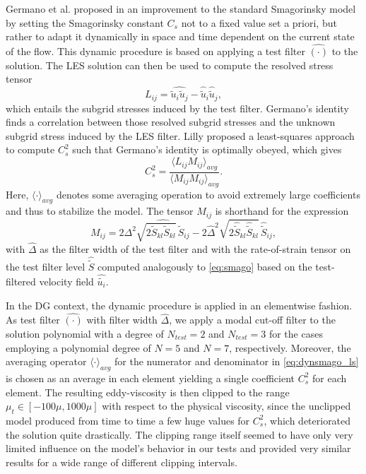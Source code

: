 Germano et al. proposed in \cite{germano1991dynamic} an improvement to the standard Smagorinsky model by setting the Smagorinsky constant $C_s$ not to a fixed value set a priori, but rather to adapt it dynamically in space and time dependent on the current state of the flow.
This dynamic procedure is based on applying a test filter $\widehat{(\cdot)}$ to the solution.
The LES solution can then be used to compute the resolved stress tensor
\begin{equation}
  L_{ij} = \widehat{\widetilde{u}_i \widetilde{u}_j} - \widehat{\widetilde{u}}_i \widehat{\widetilde{u}}_j,
\end{equation}
which entails the subgrid stresses induced by the test filter.
Germano's identity finds a correlation between those resolved subgrid stresses and the unknown subgrid stress induced by the LES filter.
Lilly \cite{lilly1992proposed} proposed a least-squares approach to compute $C_s^2$ such that Germano's identity is optimally obeyed, which gives
\begin{equation}
  C_s^2 = \frac{\langle L_{ij}M_{ij}\rangle_{avg}}{\langle M_{ij}M_{ij} \rangle_{avg}}.
  \label{eq:dynsmago_ls}
\end{equation}
Here, $\langle\cdot\rangle_{avg}$ denotes some averaging operation to avoid extremely large coefficients and thus to stabilize the model.
The tensor $M_{ij}$ is shorthand for the expression
\begin{equation}
  M_{ij} = 2 \Delta^2 \widehat{\sqrt{2\tilde{S}_{kl}\tilde{S}_{kl}}\,\tilde{S}_{ij}}  - 2 \widehat{\Delta}^2 \sqrt{2\widehat{\tilde{S}}_{kl}\widehat{\tilde{S}}_{kl}}\, \widehat{\tilde{S}}_{ij},
\end{equation}
with $\widehat{\Delta}$ as the filter width of the test filter and with the rate-of-strain tensor on the test filter level $\widehat{\tilde{S}}$ computed analogously to \eqref{eq:smago} based on the test-filtered velocity field $\widehat{\tilde{u_i}}$.

In the DG context, the dynamic procedure is applied in an elementwise fashion.
As test filter $\widehat{(\cdot)}$ with filter width $\widehat{\Delta}$, we apply a modal cut-off filter to the solution polynomial with a degree of $N_{test}=2$ and $N_{test}=3$ for the cases employing a polynomial degree of $N=5$ and $N=7$, respectively.
Moreover, the averaging operator $\langle\cdot\rangle_{avg}$ for the numerator and denominator in \eqref{eq:dynsmago_ls} is chosen as an average in each element yielding a single coefficient $C_s^2$ for each element.
The resulting eddy-viscosity is then clipped to the range $\mu_t \in [-100\mu,1000\mu]$ with respect to the physical viscosity, since the unclipped model produced from time to time a few huge values for $C_s^2$, which deteriorated the solution quite drastically.
The clipping range itself seemed to have only very limited influence on the model's behavior in our tests and provided very similar results for a wide range of different clipping intervals.

